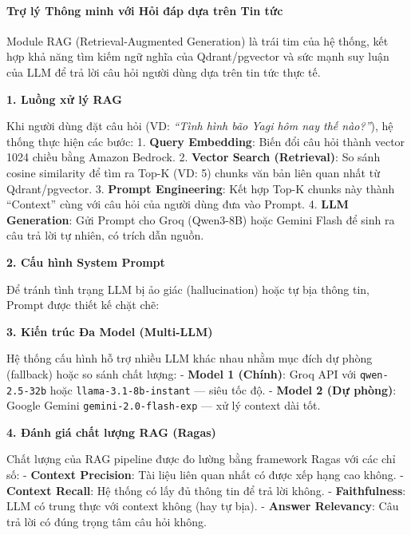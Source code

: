 \hypertarget{trux1ee3-luxfd-thuxf4ng-minh-vux1edbi-hux1ecfi-ux111uxe1p-dux1ef1a-truxean-tin-tux1ee9c}{%
\paragraph{Trợ lý Thông minh với Hỏi đáp dựa trên Tin
tức}}

Module RAG (Retrieval-Augmented Generation) là trái tim của hệ thống,
kết hợp khả năng tìm kiếm ngữ nghĩa của Qdrant/pgvector và sức mạnh suy
luận của LLM để trả lời câu hỏi người dùng dựa trên tin tức thực tế.

\textbf{1. Luồng xử lý RAG}

Khi người dùng đặt câu hỏi (VD: \emph{``Tình hình bão Yagi hôm nay thế
nào?''}), hệ thống thực hiện các bước: 1. \textbf{Query Embedding}: Biến
đổi câu hỏi thành vector 1024 chiều bằng Amazon Bedrock. 2.
\textbf{Vector Search (Retrieval)}: So sánh cosine similarity để tìm ra
Top-K (VD: 5) chunks văn bản liên quan nhất từ Qdrant/pgvector. 3.
\textbf{Prompt Engineering}: Kết hợp Top-K chunks này thành ``Context''
cùng với câu hỏi của người dùng đưa vào Prompt. 4. \textbf{LLM
Generation}: Gửi Prompt cho Groq (Qwen3-8B) hoặc Gemini Flash để sinh ra
câu trả lời tự nhiên, có trích dẫn nguồn.

\textbf{2. Cấu hình System Prompt}

Để tránh tình trạng LLM bị ảo giác (hallucination) hoặc tự bịa thông
tin, Prompt được thiết kế chặt chẽ:

\begin{Shaded}
\begin{Highlighting}[]
\OperatorTok{=} 
\end{Highlighting}
\end{Shaded}

\textbf{3. Kiến trúc Đa Model (Multi-LLM)}

Hệ thống cấu hình hỗ trợ nhiều LLM khác nhau nhằm mục đích dự phòng
(fallback) hoặc so sánh chất lượng: - \textbf{Model 1 (Chính)}: Groq API
với \texttt{qwen-2.5-32b} hoặc \texttt{llama-3.1-8b-instant} --- siêu
tốc độ. - \textbf{Model 2 (Dự phòng)}: Google Gemini
\texttt{gemini-2.0-flash-exp} --- xử lý context dài tốt.

\textbf{4. Đánh giá chất lượng RAG (Ragas)}

Chất lượng của RAG pipeline được đo lường bằng framework Ragas với các
chỉ số: - \textbf{Context Precision}: Tài liệu liên quan nhất có được
xếp hạng cao không. - \textbf{Context Recall}: Hệ thống có lấy đủ thông
tin để trả lời không. - \textbf{Faithfulness}: LLM có trung thực với
context không (hay tự bịa). - \textbf{Answer Relevancy}: Câu trả lời có
đúng trọng tâm câu hỏi không.
